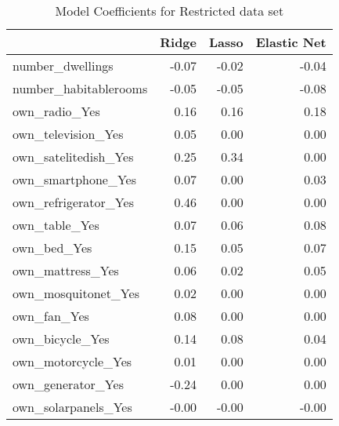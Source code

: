 \begin{longtable}{lrrr}


\caption{Model Coefficients for Restricted data set}
\label{table:MergedRestrict}

\\\hline
{} &  Ridge  &  Lasso  &  Elastic Net  \\
\hline
\endhead

\hline
\endfoot

number\_dwellings &              -0.07 &               -0.02 &                     -0.04 \\
number\_habitablerooms &              -0.05 &               -0.05 &                     -0.08 \\
own\_radio\_Yes &               0.16 &                0.16 &                      0.18 \\
own\_television\_Yes &               0.05 &                0.00 &                      0.00 \\
own\_satelitedish\_Yes &               0.25 &                0.34 &                      0.00 \\
own\_smartphone\_Yes &               0.07 &                0.00 &                      0.03 \\
own\_refrigerator\_Yes &               0.46 &                0.00 &                      0.00 \\
own\_table\_Yes &               0.07 &                0.06 &                      0.08 \\
own\_bed\_Yes &               0.15 &                0.05 &                      0.07 \\
own\_mattress\_Yes &               0.06 &                0.02 &                      0.05 \\
own\_mosquitonet\_Yes &               0.02 &                0.00 &                      0.00 \\
own\_fan\_Yes &               0.08 &                0.00 &                      0.00 \\
own\_bicycle\_Yes &               0.14 &                0.08 &                      0.04 \\
own\_motorcycle\_Yes &               0.01 &                0.00 &                      0.00 \\
own\_generator\_Yes &              -0.24 &                0.00 &                      0.00 \\
own\_solarpanels\_Yes &              -0.00 &               -0.00 &                     -0.00 \\

\end{longtable}
